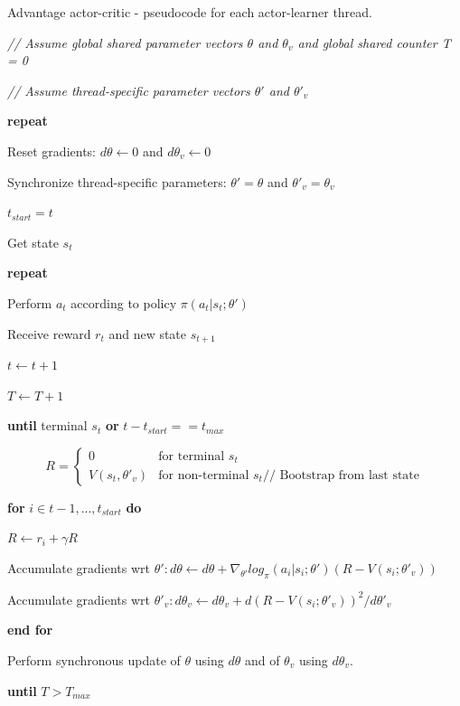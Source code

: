 \begin{algorithm}
\caption{Advantage actor-critic - pseudocode for each actor-learner thread.} \label{algorithm:A2C}
\emph{// Assume global shared parameter vectors $\theta$ and $\theta_v$ and global shared counter T = 0}

\emph{// Assume thread-specific parameter vectors $\theta'$ and $\theta'_v$}

\textbf{repeat}

\qquad Reset gradients: $d\theta \leftarrow 0$ and $d\theta_v \leftarrow 0$

\qquad Synchronize thread-specific parameters: $\theta' = \theta$ and $\theta'_v = \theta_v$

\qquad $t_{start} = t$

\qquad Get state $s_t$

\qquad \textbf{repeat}

\qquad \qquad Perform $a_t$ according to policy $\pi(a_t | s_t; \theta')$

\qquad \qquad Receive reward $r_t$ and new state $s_{t+1}$

\qquad \qquad $t \leftarrow t + 1$

\qquad \qquad $T \leftarrow T + 1$

\qquad \textbf{until} terminal $s_t$ \textbf{or} $t-t_{start} == t_{max}$

\[
R = \begin{cases}
  0  & \text{for terminal $s_t$}\\
  V(s_t, \theta'_v) & \text{for non-terminal $s_t$// Bootstrap from last state}
\end{cases}
\]

\qquad \textbf{for} $i \in {t-1, ..., t_{start}}$ \textbf{do}

\qquad \qquad $R \leftarrow r_i + \gamma R$

\qquad \qquad Accumulate gradients wrt $\theta': d\theta \leftarrow d\theta + \nabla_{\theta'} log_\pi(a_i | s_i; \theta')(R-V(s_i; \theta'_v))$

\qquad \qquad Accumulate gradients wrt $\theta'_v: d\theta_v \leftarrow d\theta_v + d(R - V(s_i; \theta'_v))^2 / d\theta'_v$

\qquad \textbf{end for}

\qquad Perform synchronous update of $\theta$ using $d\theta$ and of $\theta_v$ using $d\theta_v$.

\textbf{until} $T > T_{max}$


\end{algorithm}

